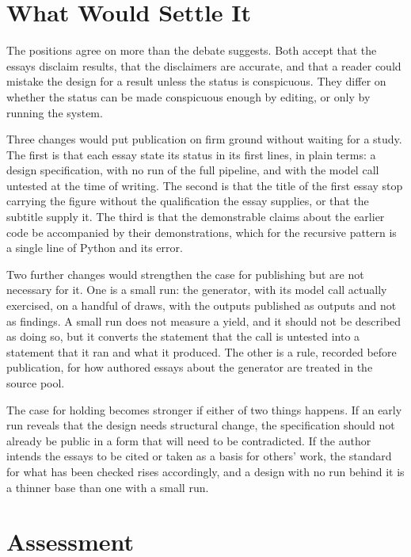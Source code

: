 \documentclass[11pt]{article}
\begin{document}
\section{What Would Settle It}

The positions agree on more than the debate suggests. Both accept that the essays disclaim results, that the disclaimers are accurate, and that a reader could mistake the design for a result unless the status is conspicuous. They differ on whether the status can be made conspicuous enough by editing, or only by running the system.

Three changes would put publication on firm ground without waiting for a study. The first is that each essay state its status in its first lines, in plain terms: a design specification, with no run of the full pipeline, and with the model call untested at the time of writing. The second is that the title of the first essay stop carrying the figure without the qualification the essay supplies, or that the subtitle supply it. The third is that the demonstrable claims about the earlier code be accompanied by their demonstrations, which for the recursive pattern is a single line of Python and its error.

Two further changes would strengthen the case for publishing but are not necessary for it. One is a small run: the generator, with its model call actually exercised, on a handful of draws, with the outputs published as outputs and not as findings. A small run does not measure a yield, and it should not be described as doing so, but it converts the statement that the call is untested into a statement that it ran and what it produced. The other is a rule, recorded before publication, for how authored essays about the generator are treated in the source pool.

The case for holding becomes stronger if either of two things happens. If an early run reveals that the design needs structural change, the specification should not already be public in a form that will need to be contradicted. If the author intends the essays to be cited or taken as a basis for others' work, the standard for what has been checked rises accordingly, and a design with no run behind it is a thinner base than one with a small run.

\section{Assessment}
\end{document}
